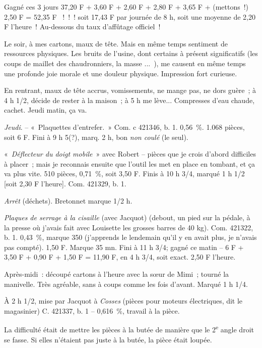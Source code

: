 \documentclass[french,twoside]{book} %
\begin{document}
Gagné ces 3 jours 37,20 F + 3,60 F + 2,60 F + 2,80 F + 3,65 F + (mettons !) 2,50 F = 52,35 F  ! ! ! soit 17,43 F par journée de 8 h, soit une moyenne de 2,20 F l'heure ! Au-dessous du taux d'affûtage officiel !\par
Le soir, à mes cartons, maux de tête. Mais en même temps sentiment de ressources physiques. Les bruits de l'usine, dont certains à présent significatifs (les coups de maillet des chaudronniers, la masse ... ), me causent en même temps une profonde joie morale et une douleur physique. Impression fort curieuse.\par
En rentrant, maux de tête accrus, vomissements, ne mange pas, ne dors guère ; à 4 h 1/2, décide de rester à la maison ; à 5 h me lève... Compresses d'eau chaude, cachet. Jeudi matin, ça va.\par
{\itshape Jeudi}. – « Plaquettes d'entrefer. » Com. c 421346, b. 1. 0,56 \%. 1.068 pièces, soit 6 F. Fini à 9 h 5(?), marq. 2 h, bon {\itshape non coulé} (le seul).\par
« {\itshape Déflecteur du doigt mobile} » avec Robert – pièces que je crois d'abord difficiles à placer ; mais je reconnais ensuite que l'outil les met en place en tombant, et ça va plus vite. 510 pièces, 0,71 \%, soit 3,50 F. Finis à 10 h 3/4, marqué 1 h 1/2 [soit 2,30 F l'heure]. Com. 421329, b. 1.\par
{\itshape Arrêt} (déchets). Bretonnet marque 1/2 h.\par
{\itshape Plaques de serrage à la cisaille} (avec Jacquot) (debout, un pied sur la pédale, à la presse où j'avais fait avec Louisette les grosses barres de 40 kg). Com. 421322, b. 1. 0,43 \%, marque 350 (j'apprends le lendemain qu'il y en avait plus, je n'avais pas compté). 1,50 F. Marque 35 mn. Fini à 11 h 3/4; gagné ce matin – 6 F + 3,50 F + 0,90 F + 1,50 F = 11,90 F, en 4 h 3/4, soit exact. 2,50 F l'heure.\par
Après-midi : découpé cartons à l'heure avec la sœur de Mimi ; tourné la manivelle. Très agréable, sans à coups comme les fois d'avant. Marqué 1 h 1/4.\par
À 2 h 1/2, mise par Jacquot à {\itshape Cosses} (pièces pour moteurs électriques, dit le magasinier) C. 421337, b. 1 – 0,616 \%, travail à la pièce.\par
La difficulté était de mettre les pièces à la butée de manière que le 2\textsuperscript{e} angle droit se fasse. Si elles n'étaient pas juste à la butée, la pièce était loupée.\par
\end{document}
